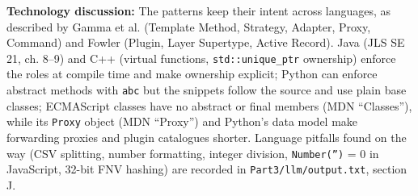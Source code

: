 \documentclass[11pt,a4paper]{article}
\newcommand{\field}[2]{\textbf{#1:} #2\par}
\begin{document}
\field{Technology discussion}{The patterns keep their intent across languages, as described by Gamma et al. (Template Method, Strategy, Adapter, Proxy, Command) and Fowler (Plugin, Layer Supertype, Active Record). Java (JLS SE 21, ch. 8--9) and C++ (virtual functions, \texttt{std::unique\_\allowbreak{}ptr} ownership) enforce the roles at compile time and make ownership explicit; Python can enforce abstract methods with \texttt{abc} but the snippets follow the source and use plain base classes; ECMAScript classes have no abstract or final members (MDN ``Classes''), while its \texttt{Proxy} object (MDN ``Proxy'') and Python's data model make forwarding proxies and plugin catalogues shorter. Language pitfalls found on the way (CSV splitting, number formatting, integer division, \texttt{Number('')} = 0 in JavaScript, 32-bit FNV hashing) are recorded in \texttt{Part3/\allowbreak{}llm/\allowbreak{}output.\allowbreak{}txt}, section J.}
\end{document}
